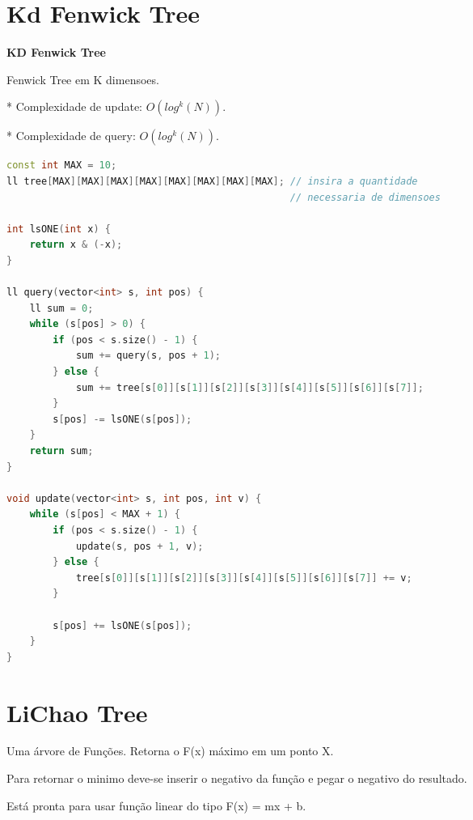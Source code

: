 \documentclass[11pt, a4paper, oneside]{book}
\begin{document}
\hfill

\section{Kd Fenwick Tree}


\textbf{KD Fenwick Tree} 



Fenwick Tree em K dimensoes.



* Complexidade de update: $O(log^k(N))$.

* Complexidade de query: $O(log^k(N))$.
\hfill

\begin{multicols}{2}
\begin{lstlisting}[language=C++]
const int MAX = 10;
ll tree[MAX][MAX][MAX][MAX][MAX][MAX][MAX][MAX]; // insira a quantidade
                                                 // necessaria de dimensoes

int lsONE(int x) {
    return x & (-x);
}

ll query(vector<int> s, int pos) {
    ll sum = 0;
    while (s[pos] > 0) {
        if (pos < s.size() - 1) {
            sum += query(s, pos + 1);
        } else {
            sum += tree[s[0]][s[1]][s[2]][s[3]][s[4]][s[5]][s[6]][s[7]];
        }
        s[pos] -= lsONE(s[pos]);
    }
    return sum;
}

void update(vector<int> s, int pos, int v) {
    while (s[pos] < MAX + 1) {
        if (pos < s.size() - 1) {
            update(s, pos + 1, v);
        } else {
            tree[s[0]][s[1]][s[2]][s[3]][s[4]][s[5]][s[6]][s[7]] += v;
        }

        s[pos] += lsONE(s[pos]);
    }
}\end{lstlisting}
\end{multicols}

\hfill

\section{LiChao Tree}


Uma árvore de Funções. Retorna o F(x) máximo em um ponto X.



Para retornar o minimo deve-se inserir o negativo da função e pegar o negativo do resultado.



Está pronta para usar função linear do tipo F(x) = mx + b.
\end{document}
